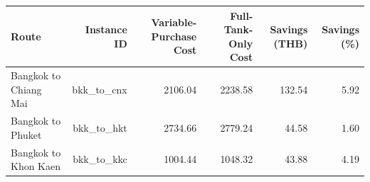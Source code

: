 \begin{tabular}{lrrrrr}
\hline
Route & Instance ID & Variable-Purchase Cost & Full-Tank-Only Cost & Savings (THB) & Savings (\%) \\
\hline
Bangkok to Chiang Mai & bkk\_to\_cnx & 2106.04 & 2238.58 & 132.54 & 5.92 \\
Bangkok to Phuket & bkk\_to\_hkt & 2734.66 & 2779.24 & 44.58 & 1.60 \\
Bangkok to Khon Kaen & bkk\_to\_kkc & 1004.44 & 1048.32 & 43.88 & 4.19 \\
\hline
\end{tabular}

